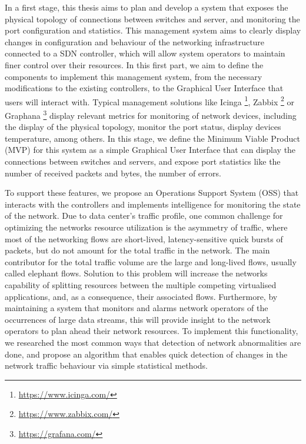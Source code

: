 In a first stage, this thesis aims to plan and develop a system that exposes the physical topology of connections between switches and server, and monitoring
the port configuration and statistics. This management system aims to clearly display changes in configuration and behaviour of the networking infrastructure
connected to a SDN controller, which will allow system operators to maintain finer control over their resources. In this first part, we aim to define the 
components to implement this management system, from the necessary modifications to the existing controllers, to the Graphical User Interface that users will 
interact with. Typical management solutions like Icinga \footnote{\url{https://www.icinga.com/}}, Zabbix \footnote{\url{https://www.zabbix.com/}} or
Graphana \footnote{\url{https://grafana.com/}} display relevant metrics for monitoring of network devices, including the display of the
physical topology, monitor the port status, display devices temperature, among others. In this stage, we define the Minimum Viable Product (MVP) for this system as a
simple Graphical User Interface that can display the connections between switches and servers, and expose port statistics like the number of received packets
and bytes, the number of errors.

\par To support these features, we propose an Operations Support System (OSS) that interacts with the controllers and implements intelligence for monitoring 
the state of the network. Due to data center's traffic profile, one common challenge for optimizing the networks resource utilization is the asymmetry of traffic, 
where most of the networking flows are short-lived, latency-sensitive quick bursts of packets, but do not
amount for the total traffic in the network. The main contributor for the total traffic volume are the large and long-lived flows, usually called elephant flows.
Solution to this problem will increase the networks capability of splitting resources between the multiple competing virtualised applications, and, as a consequence,
their associated flows. Furthermore, by maintaining a system that monitors and alarms network operators of the occurrences of large data streams, this will provide
insight to the network operators to plan ahead their network resources. To implement this functionality, we researched the most common ways that detection of network
abnormalities are done, and propose an algorithm that enables quick detection of changes in the network traffic behaviour via simple statistical methods.

